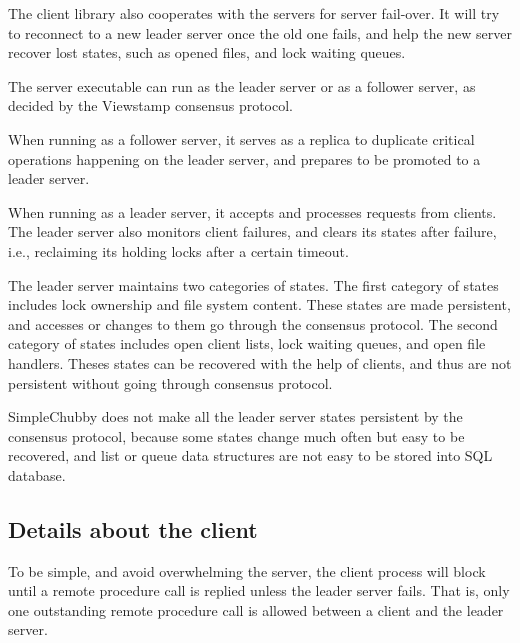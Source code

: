 The client library also cooperates with the servers for server fail-over.  
It will try to reconnect to a new leader server once the old one fails,
and help the new server recover lost states,
such as opened files, and lock waiting queues.

The server executable can run as the leader server or as a follower server,
as decided by the Viewstamp consensus protocol.

When running as a follower server, it serves as a replica to duplicate critical
operations happening on the leader server, and prepares to be promoted to a leader
server.

When running as a leader server, it accepts and processes requests from clients.
The leader server also monitors client failures, and clears its states after failure,
i.e., reclaiming its holding locks after a certain timeout.

The leader server maintains two categories of states.
The first category of states includes lock ownership and file system content. These
states are made persistent, and accesses or changes to them go through the consensus
protocol.
The second category of states includes open client lists, lock waiting queues,
and open file handlers.
Theses states can be recovered with the help of clients,
and thus are not persistent without going through consensus protocol.

SimpleChubby does not make all the leader server states persistent by the consensus
protocol, because some states change much often but easy to be recovered,
and list or queue data structures are not easy to be stored into SQL database.
 
\subsection{Details about the client}
To be simple, and avoid overwhelming the server, the client process will block until a remote procedure call is
replied unless the leader server fails. That is, only one outstanding remote procedure call is allowed between
a client and the leader server.
